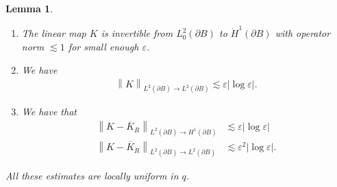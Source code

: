 \documentclass[JEP,XML,SOM,Unicode,published]{cedram}
\let\epsilon\varepsilon
\newtheorem{lemma}[theorem]{Lemma}
\theoremstyle{definition}
\newcommand\norm[1]{\left\lVert #1\right\rVert}
\let\de\partial
\let\eps\epsilon
\begin{document}
\skpt\begin{lemma}\label{K bd}
\begin{enumerate}
\item\label{K bda}
The linear map $K$ is invertible from $L_0^2(\de B)$ to $\dot{H}^1(\de B)$ with operator norm $\lesssim 1$ for small enough $\eps$.
\item\label{K bdb}
We have
\begin{align*}
\norm{K}_{L^2(\de B)\to L^2(\de B)}\lesssim \eps|{\log\eps}|.
\end{align*}
\item\label{K bdc}
We have that
\begin{align*}
\norm{K-\overline{K}_R}_{L^2(\de B)\to H^1(\de B)}&\lesssim \eps|{\log\eps}|\\
\tag*{and}
\norm{K-\overline{K}_R}_{L^2(\de B)\to L^2(\de B)}&\lesssim \eps^2|{\log\eps}|.
\end{align*}
\end{enumerate}
All these estimates are locally uniform in $q$.
\end{lemma}
\end{document}
